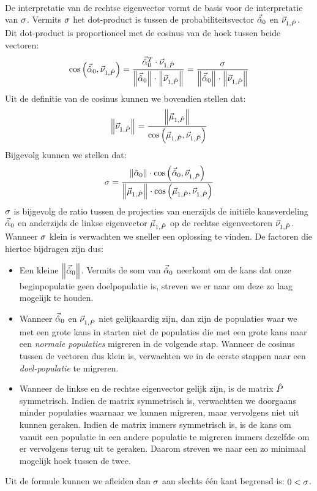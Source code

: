 \paragraph{}
De interpretatie van de rechtse eigenvector vormt de basis voor de interpretatie van $\metapa$. Vermits $\metapa$ het dot-product is tussen de probabiliteitsvector $\probdistnormmeta{0}$ en $\evr[1,\removmat]$. Dit dot-product is proportioneel met de cosinus van de hoek tussen beide vectoren:
\begin{equation}
\fun{\cos}{\probdistnormmeta{0},\evr[1,\removmat]}=\displaystyle\frac{\probdistnormmeta{0}^T\cdot\evr[1,\removmat]}{\dabs{\probdistnormmeta{0}}\cdot\dabs{\evr[1,\removmat]}}=\displaystyle\frac{\metapa}{\dabs{\probdistnormmeta{0}}\cdot\dabs{\evr[1,\removmat]}}
\end{equation}
Uit de definitie van de cosinus kunnen we bovendien stellen dat:
\begin{equation}
\dabs{\evr[1,\removmat]}=\displaystyle\frac{\dabs{\evl[1,\removmat]}}{\fun{\cos}{\evl[1,\removmat],\evr[1,\removmat]}}
\end{equation}
Bijgevolg kunnen we stellen dat:
\begin{equation}
\metapa=\displaystyle\frac{\dabs{\hat{\alpha}_0}\cdot\fun{\cos}{\probdistnormmeta{0},\evr[1,\removmat]}}{\dabs{\evl[1,\removmat]}\cdot\fun{\cos}{\evl[1,\removmat],\evr[1,\removmat]}}
\eqnlab{sigmaMeaning}
\end{equation}
$\metapa$ is bijgevolg de ratio tussen de projecties van enerzijds de initi\"ele kansverdeling $\probdistnormmeta{0}$ en anderzijds de linkse eigenvector $\evl[1,\removmat]$ op de rechtse eigenvectoren $\evr[1,\removmat]$. Wanneer $\metapa$ klein is verwachten we sneller een oplossing te vinden. De factoren die hiertoe bijdragen zijn dus:
\begin{itemize}
 \item Een kleine $\dabs{\probdistnormmeta{0}}$. Vermits de som van $\probdistnormmeta{0}$ neerkomt om de kans dat onze beginpopulatie geen doelpopulatie is, streven we er naar om deze zo laag mogelijk te houden.
 \item Wanneer $\probdistnormmeta{0}$ en $\evr[1,\removmat]$ niet gelijkaardig zijn, dan zijn de populaties waar we met een grote kans in starten niet de populaties die met een grote kans naar een \emph{normale populaties} migreren in de volgende stap. Wanneer de cosinus tussen de vectoren dus klein is, verwachten we in de eerste stappen naar een \emph{doel-populatie} te migreren.
 \item Wanneer de linkse en de rechtse eigenvector gelijk zijn, is de matrix $\removmat$ symmetrisch. Indien de matrix symmetrisch is, verwachtten we doorgaans minder populaties waarnaar we kunnen migreren, maar vervolgens niet uit kunnen geraken. Indien de matrix immers symmetrisch is, is de kans om vanuit een populatie in een andere populatie te migreren immers dezelfde om er vervolgens terug uit te geraken. Daarom streven we naar een zo minimaal mogelijk hoek tussen de twee.
\end{itemize}
Uit de formule kunnen we afleiden dan $\metapa$ aan slechts \'e\'en kant begrensd is: $0<\metapa$.

